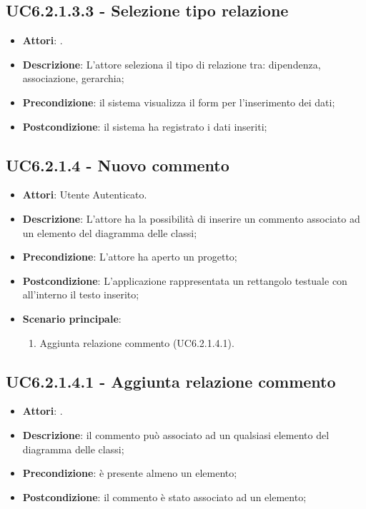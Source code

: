 \subsection{UC6.2.1.3.3 - Selezione tipo relazione} 
\label{ssec:UC6.2.1.3.3} 
\begin{itemize} 
\item \textbf{Attori}: .
\item \textbf{Descrizione}: L'attore seleziona il tipo di relazione tra: dipendenza, associazione, gerarchia;
\item \textbf{Precondizione}: il sistema visualizza il form per l'inserimento dei dati;
\item \textbf{Postcondizione}: il sistema ha registrato i dati inseriti;
\end{itemize} 
\subsection{UC6.2.1.4 - Nuovo commento} 
\label{ssec:UC6.2.1.4} 
\begin{itemize} 
\item \textbf{Attori}: Utente Autenticato.
\item \textbf{Descrizione}: L'attore ha la possibilità di inserire un commento associato ad un elemento del diagramma delle classi;
\item \textbf{Precondizione}: L'attore ha aperto un progetto;
\item \textbf{Postcondizione}: L'applicazione rappresentata un rettangolo testuale con all'interno il testo inserito;
\item \textbf{Scenario principale}: \begin{enumerate}\item Aggiunta relazione commento (UC6.2.1.4.1). 
 \end{enumerate}
\end{itemize} 
\subsection{UC6.2.1.4.1 - Aggiunta relazione commento} 
\label{ssec:UC6.2.1.4.1} 
\begin{itemize} 
\item \textbf{Attori}: .
\item \textbf{Descrizione}: il commento può associato ad un qualsiasi elemento del diagramma delle classi;
\item \textbf{Precondizione}: è presente almeno un elemento;
\item \textbf{Postcondizione}: il commento è stato associato ad un elemento;
\end{itemize} 

